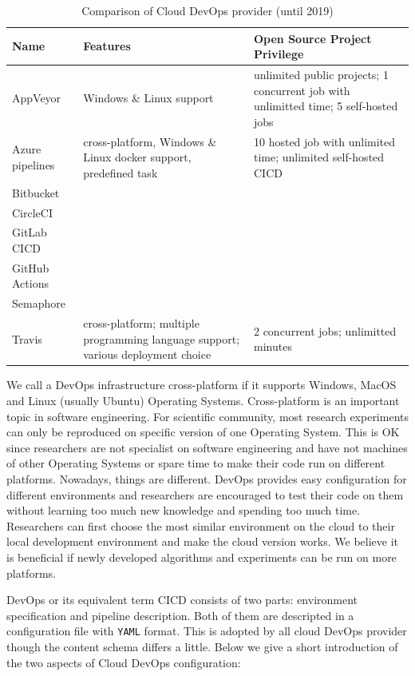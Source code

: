 \documentclass{IEEEcsmag}
\begin{document}
\begin{table}
\caption{Comparison of Cloud DevOps provider (until 2019)}
\label{table}
\small
\begin{tabular*}{17.5pc}{@{}|p{39pt}|p{73pt}<{\raggedright}|p{60pt}<{\raggedright}|@{}}
\hline
Name& 
Features& 
Open Source Project Privilege\\
\hline
AppVeyor& Windows \& Linux support & unlimited public projects; 1 concurrent job with unlimitted time; 5 self-hosted jobs
 \\
 \hline
 Azure pipelines & cross-platform, Windows \& Linux docker support, predefined task & 10 hosted job with unlimited time; unlimited self-hosted CICD
 \\
 \hline
  Bitbucket& & 
 \\
 \hline
   CircleCI& & 
 \\
 \hline
GitLab CICD& 
& 
\\
\hline
GitHub Actions& 
& 
\\
\hline
Semaphore &
&
\\
\hline
Travis& 
cross-platform; multiple programming language support; various deployment choice
& 2 concurrent jobs; unlimitted minutes
\\
\hline
\end{tabular*}
\label{tab1}
\end{table}

We call a DevOps infrastructure cross-platform if it supports Windows, MacOS and Linux (usually Ubuntu) Operating Systems.
Cross-platform is an important topic in software engineering. For scientific community, most research experiments can only be reproduced on specific version of one Operating System. This is OK since researchers are not specialist on software engineering and have not machines of other Operating Systems or spare time to make their code run on different platforms. Nowadays, things are different. DevOps provides easy configuration for different environments and researchers are encouraged to test their code on them without learning too much new knowledge and spending too much time. Researchers can first choose the most similar environment on the cloud to their local development environment and make the cloud version works. We believe it is beneficial if newly developed algorithms and experiments can be run on more platforms. 

DevOps or its equivalent term CICD consists of two parts: environment specification and pipeline description. 
Both of them are descripted in a configuration file with \texttt{YAML} format. This is adopted by all cloud DevOps provider though the content schema differs a little. Below we give a short introduction of the two aspects of Cloud DevOps configuration:
\end{document}
